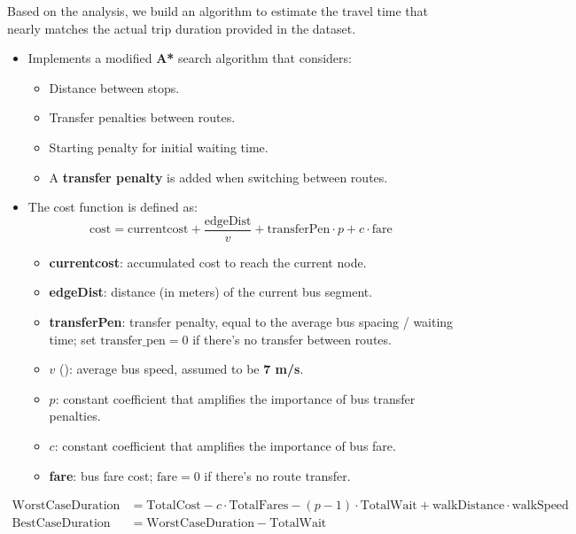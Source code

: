 Based on the analysis, we build an algorithm to estimate the travel time that nearly matches the actual trip duration provided in the dataset.

\begin{itemize}
    \item Implements a modified \textbf{A*} search algorithm that considers:
    \begin{itemize}
        \item Distance between stops.
        \item Transfer penalties between routes.
        \item Starting penalty for initial waiting time.
        \item A \textbf{transfer penalty} is added when switching between routes.
    \end{itemize}

    \item The cost function is defined as:
    \[
    \text{cost} = \text{currentcost} + \frac{\text{edgeDist}}{v} + \text{transferPen} \cdot p + c \cdot \text{fare}
    \]
    \begin{itemize}
        \item \textbf{currentcost}: accumulated cost to reach the current node.
        \item \textbf{edgeDist}: distance (in meters) of the current bus segment.
        \item \textbf{transferPen}: transfer penalty, equal to the average bus spacing / waiting time; set $\text{transfer\_pen} = 0$ if there's no transfer between routes.
        \item $v$ (): average bus speed, assumed to be \textbf{7 m/s}.
        \item $p$: constant coefficient that amplifies the importance of bus transfer penalties.
        \item $c$: constant coefficient that amplifies the importance of bus fare.
        \item \textbf{fare}: bus fare cost; $\text{fare} = 0$ if there's no route transfer.
    \end{itemize}
\end{itemize}

\begin{align*}
    \text{WorstCaseDuration} &= \text{TotalCost} - c \cdot \text{TotalFares} - (p-1) \cdot \text{TotalWait} + \text{walkDistance} \cdot \text{walkSpeed} \\
    \text{BestCaseDuration} &= \text{WorstCaseDuration} - \text{TotalWait}
\end{align*}

